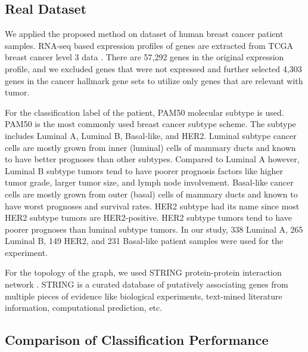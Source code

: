 \documentclass{article}
\begin{document}
\subsection{Real Dataset}
We applied the proposed method on dataset of human breast cancer patient samples. RNA-seq based expression profiles of genes are extracted from TCGA breast cancer level 3 data \cite{prat2012comprehensive}.
There are 57,292 genes in the original expression profile, and we excluded genes that were not expressed and further selected 4,303 genes in the cancer hallmark gene sets  \cite{liberzon2015molecular} to utilize only genes that are relevant with tumor.

For the classification label of the patient, PAM50 molecular subtype is used. PAM50 is the most commonly used breast cancer subtype scheme. The subtype includes Luminal A, Luminal B, Basal-like, and HER2.
Luminal subtype cancer cells are mostly grown from inner (luminal) cells of mammary ducts and known to have better prognoses than other subtypes. Compared to Luminal A however, Luminal B subtype tumors tend to have poorer prognosis factors like
higher tumor grade, larger tumor size, and lymph node involvement. Basal-like cancer cells are mostly grown from outer (basal) cells of mammary ducts and known to have worst prognoses and survival rates. HER2 subtype had its name since most HER2 subtype tumors are HER2-positive. HER2 subtype tumors tend to have poorer prognoses than luminal subtype tumors. In our study, 338 Luminal A, 265 Luminal B, 149 HER2, and 231 Basal-like patient samples were used for the experiment.

For the topology of the graph, we used STRING protein-protein interaction network \cite{szklarczyk2014string}. STRING is a curated database of putatively associating genes from multiple pieces of evidence like biological experiments, text-mined literature information, computational prediction, etc. 


\subsection{Comparison of Classification Performance}
\end{document}
